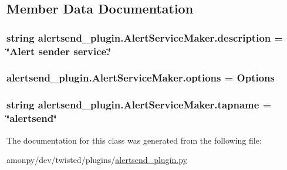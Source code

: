 \subsection{Member Data Documentation}
\hypertarget{classalertsend__plugin_1_1_alert_service_maker_ae4010cf4a7c97046d526cee0b1febcf2}{
\subsubsection[{description}]{\setlength{\rightskip}{0pt plus 5cm}string alertsend\-\_\-plugin.\-Alert\-Service\-Maker.\-description = \char`\"{}Alert sender service.\char`\"{}\hspace{0.3cm}{\ttfamily [static]}}}\label{classalertsend__plugin_1_1_alert_service_maker_ae4010cf4a7c97046d526cee0b1febcf2}
\hypertarget{classalertsend__plugin_1_1_alert_service_maker_a3ca254bf6fd586ded22ae26866a8dbb9}{
\subsubsection[{options}]{\setlength{\rightskip}{0pt plus 5cm}alertsend\-\_\-plugin.\-Alert\-Service\-Maker.\-options = {\bf Options}\hspace{0.3cm}{\ttfamily [static]}}}\label{classalertsend__plugin_1_1_alert_service_maker_a3ca254bf6fd586ded22ae26866a8dbb9}
\hypertarget{classalertsend__plugin_1_1_alert_service_maker_abf35c4fc0c983dfca5201f25cb643a1a}{
\subsubsection[{tapname}]{\setlength{\rightskip}{0pt plus 5cm}string alertsend\-\_\-plugin.\-Alert\-Service\-Maker.\-tapname = \char`\"{}alertsend\char`\"{}\hspace{0.3cm}{\ttfamily [static]}}}\label{classalertsend__plugin_1_1_alert_service_maker_abf35c4fc0c983dfca5201f25cb643a1a}


The documentation for this class was generated from the following file\-:\begin{DoxyCompactItemize}
\item 
amonpy/dev/twisted/plugins/\hyperlink{alertsend__plugin_8py}{alertsend\-\_\-plugin.\-py}\end{DoxyCompactItemize}
